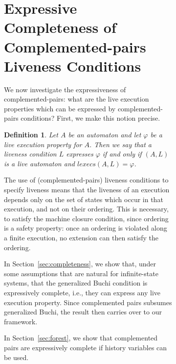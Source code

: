 \documentclass[11pt]{article}
\newcommand{\bd}{\begin{definition}}
\newcommand{\ed}{\end{definition}}
\newcommand{\intrdef}{\emph}	\newcommand{\intr}{\emph}
\newcommand{\lexecs}{\mathit{lexecs}}
\newtheorem{definition}{Definition}
\begin{document}
\begin{figure}[htb]
\begin{figure}[htb]
\section{Expressive Completeness of Complemented-pairs Liveness Conditions}
\label{sec:expressiveness}





We now investigate the expressiveness of complemented-pairs: what 
are the live execution properties which can be expressed by
complemented-pairs conditions? First, we make this notion precise.

\bd
Let $A$ be an automaton and 
let $\varphi$ be a live execution property for $A$. Then we say that
a liveness condition $L$ \intrdef{expresses} $\varphi$ if and only if 
$(A,L)$ is a live automaton and $\lexecs(A,L) = \varphi$.
\ed


The use of (complemented-pairs) liveness conditions to specify
liveness means that the liveness of an execution depends only on the
set of states which occur in that execution, and not on their
ordering. This is necessary, to satisfy the machine closure condition,
since ordering is a safety property: once an ordering is violated
along a finite execution, no extension can then satisfy the ordering.

In Section~\ref{sec:completeness}, we show that, under some
assumptions that are natural for infinite-state systems, that the
generalized Buchi condition is expressively complete, i.e., they can
express any live execution property. Since complemented pairs subsumes
generalized Buchi, the result then carries over to our framework.

In Section~\ref{sec:forest}, we show that complemented pairs are
expressively complete if history variables can be used.




\end{figure}
\end{figure}
\end{document}
